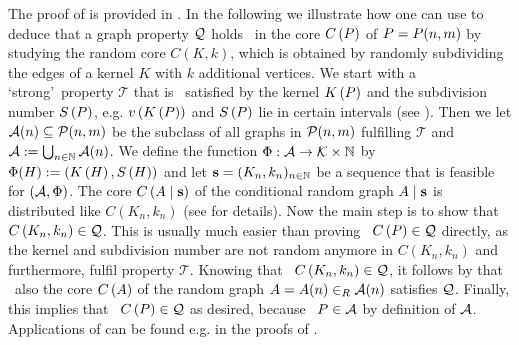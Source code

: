 The proof of  is provided in . In the following we illustrate how one can use  to deduce that a graph property $\mathcal{Q}$ holds \whp\ in the core $C\left(P\right)$ of $P=P(n,m)$ by studying the random core $C(K,k)$, which is obtained by randomly subdividing the edges of a kernel $K$ with $k$ additional vertices. We start with a \lq strong\rq\ property $\mathcal{T}$ that is \whp\ satisfied by the kernel $K\left(P\right)$ and the subdivision number $S\left(P\right)$, e.g. $v\left({K\left(P\right)}\right)$ and $S\left(P\right)$ lie in certain intervals (see ). Then we let $\mathcal{A}(n)\subseteq\mathcal{P}(n,m)$ be the subclass of all graphs in $\mathcal{P}(n,m)$ fulfilling $\mathcal{T}$ and $\mathcal{A}:=\bigcup_{n\in\mathbb{N}}\mathcal{A}(n)$. We define the function $\Phi: \mathcal{A} \to \mathcal{K}\times \mathbb{N}$ by $\Phi(H):=\left(K\left(H\right), S\left(H\right)\right)$ and let $\mathbf{s}=(K_n, k_n)_{n\in \mathbb N}$ be a sequence that is feasible for $\left(\mathcal{A}, \Phi\right)$. The core $C\left(A \mid \mathbf{s}\right)$ of the conditional random graph $A \mid \mathbf{s}$ is distributed like $C\left(K_n,k_n\right)$ (see  for details). Now the main step is to show that \whp\ $C\left(K_n,k_n\right)\in\mathcal{Q}$. This is usually much easier than proving \whp\ $C\left(P\right)\in\mathcal{Q}$ directly, as the kernel and subdivision number are not random anymore in $C\left(K_n,k_n\right)$ and furthermore, fulfil property $\mathcal{T}$. Knowing that \whp\ $C\left(K_n,k_n\right)\in\mathcal{Q}$, it follows by  that \whp\ also the core $C\left(A\right)$ of the random graph $A=A(n)\in_R\mathcal{A}(n)$ satisfies $\mathcal{Q}$. Finally, this implies that \whp\ $C\left(P\right)\in \mathcal{Q}$ as desired, because \whp\ $P\in\mathcal{A}$ by definition of $\mathcal{A}$. Applications of  can be found e.g. in the proofs of .
 
